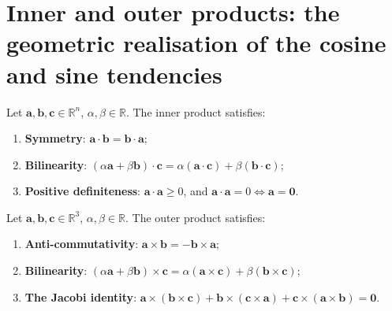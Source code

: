 \section{\texorpdfstring{Inner and outer products: the geometric realisation of the cosine and sine tendencies}{Inner and outer products: the geometric realisation of the cosine and sine tendencies}}

\begin{property}\label{prop:inner_product_properties}
Let $\mathbf{a}, \mathbf{b}, \mathbf{c} \in \mathbb{R}^n$, $\alpha, \beta \in \mathbb{R}$. The inner product satisfies:
\begin{enumerate}[label=(\roman*)]
    \item \textbf{Symmetry}: $\mathbf{a} \cdot \mathbf{b} = \mathbf{b} \cdot \mathbf{a}$;
    \item \textbf{Bilinearity}: $(\alpha\mathbf{a} + \beta\mathbf{b}) \cdot \mathbf{c} = \alpha(\mathbf{a}\cdot\mathbf{c}) + \beta(\mathbf{b}\cdot\mathbf{c})$;
    \item \textbf{Positive definiteness}: $\mathbf{a} \cdot \mathbf{a} \ge 0$, and $\mathbf{a}\cdot\mathbf{a} = 0 \iff \mathbf{a} = \mathbf{0}$.
\end{enumerate}
\end{property}

\begin{property}\label{prop:outer_product_properties}
Let $\mathbf{a}, \mathbf{b}, \mathbf{c} \in \mathbb{R}^3$, $\alpha, \beta \in \mathbb{R}$. The outer product satisfies:
\begin{enumerate}[label=(\roman*)]
    \item \textbf{Anti-commutativity}: $\mathbf{a} \times \mathbf{b} = -\mathbf{b} \times \mathbf{a}$;
    \item \textbf{Bilinearity}: $(\alpha\mathbf{a} + \beta\mathbf{b}) \times \mathbf{c} = \alpha(\mathbf{a}\times\mathbf{c}) + \beta(\mathbf{b}\times\mathbf{c})$;
    \item \textbf{The Jacobi identity}: $\mathbf{a} \times (\mathbf{b} \times \mathbf{c}) + \mathbf{b} \times (\mathbf{c} \times \mathbf{a}) + \mathbf{c} \times (\mathbf{a} \times \mathbf{b}) = \mathbf{0}$.
\end{enumerate}
\end{property}

